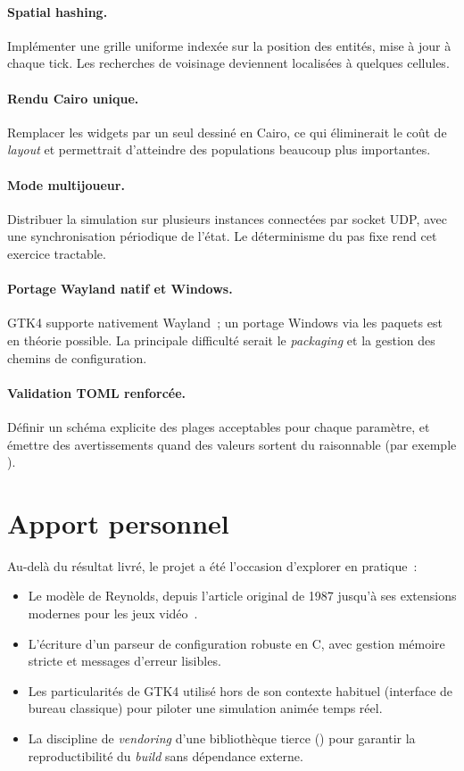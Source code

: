 \paragraph{Spatial hashing.} Implémenter une grille uniforme
indexée sur la position des entités, mise à jour à chaque tick.
Les recherches de voisinage deviennent localisées à quelques
cellules.

\paragraph{Rendu Cairo unique.} Remplacer les widgets
 par un seul  dessiné en
Cairo, ce qui éliminerait le coût de \emph{layout} et
permettrait d'atteindre des populations beaucoup plus
importantes.

\paragraph{Mode multijoueur.} Distribuer la simulation sur
plusieurs instances connectées par socket UDP, avec une
synchronisation périodique de l'état. Le déterminisme du pas
fixe rend cet exercice tractable.

\paragraph{Portage Wayland natif et Windows.} GTK4 supporte
nativement Wayland~; un portage Windows via les paquets
 est en théorie possible. La principale difficulté
serait le \emph{packaging} et la gestion des chemins de
configuration.

\paragraph{Validation TOML renforcée.} Définir un schéma
explicite des plages acceptables pour chaque paramètre, et
émettre des avertissements quand des valeurs sortent du
raisonnable (par exemple ).

\section{Apport personnel}

Au-delà du résultat livré, le projet a été l'occasion
d'explorer en pratique~:

\begin{itemize}
  \item Le modèle de Reynolds, depuis l'article original de
    1987 jusqu'à ses extensions modernes pour les jeux
    vidéo~\cite{millington2009ai}.
  \item L'écriture d'un parseur de configuration robuste en C,
    avec gestion mémoire stricte et messages d'erreur lisibles.
  \item Les particularités de GTK4 utilisé hors de son contexte
    habituel (interface de bureau classique) pour piloter une
    simulation animée temps réel.
  \item La discipline de \emph{vendoring} d'une bibliothèque
    tierce () pour garantir la reproductibilité du
    \emph{build} sans dépendance externe.
\end{itemize}

